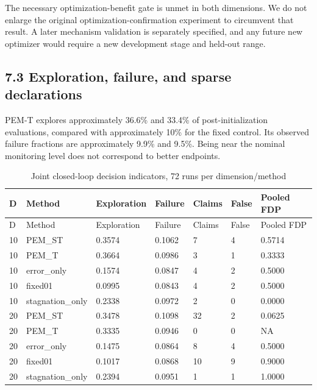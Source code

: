 \documentclass[11pt,a4paper]{article}
\begin{document}
The necessary optimization-benefit gate is unmet in both dimensions. We
do not enlarge the original optimization-confirmation experiment to
circumvent that result. A later mechanism validation is separately
specified, and any future new optimizer would require a new development
stage and held-out range.

\hypertarget{exploration-failure-and-sparse-declarations}{%
\subsection{7.3 Exploration, failure, and sparse
declarations}\label{exploration-failure-and-sparse-declarations}}

PEM-T explores approximately 36.6\% and 33.4\% of post-initialization
evaluations, compared with approximately 10\% for the fixed control. Its
observed failure fractions are approximately 9.9\% and 9.5\%. Being near
the nominal monitoring level does not correspond to better endpoints.

\par\noindent\begin{minipage}{\linewidth}

\begin{longtable}[]{@{}lllllll@{}}
\caption{Joint closed-loop decision indicators, 72 runs per
dimension/method}\tabularnewline
\toprule
D & Method & Exploration & Failure & Claims & False & Pooled FDP \\
\midrule
\endfirsthead
\toprule
D & Method & Exploration & Failure & Claims & False & Pooled FDP \\
\midrule
\endhead
10 & PEM\_ST & 0.3574 & 0.1062 & 7 & 4 & 0.5714 \\
10 & PEM\_T & 0.3664 & 0.0986 & 3 & 1 & 0.3333 \\
10 & error\_only & 0.1574 & 0.0847 & 4 & 2 & 0.5000 \\
10 & fixed01 & 0.0995 & 0.0843 & 4 & 2 & 0.5000 \\
10 & stagnation\_only & 0.2338 & 0.0972 & 2 & 0 & 0.0000 \\
20 & PEM\_ST & 0.3478 & 0.1098 & 32 & 2 & 0.0625 \\
20 & PEM\_T & 0.3335 & 0.0946 & 0 & 0 & NA \\
20 & error\_only & 0.1475 & 0.0864 & 8 & 4 & 0.5000 \\
20 & fixed01 & 0.1017 & 0.0868 & 10 & 9 & 0.9000 \\
20 & stagnation\_only & 0.2394 & 0.0951 & 1 & 1 & 1.0000 \\
\bottomrule
\end{longtable}

\end{minipage}\par
\end{document}
